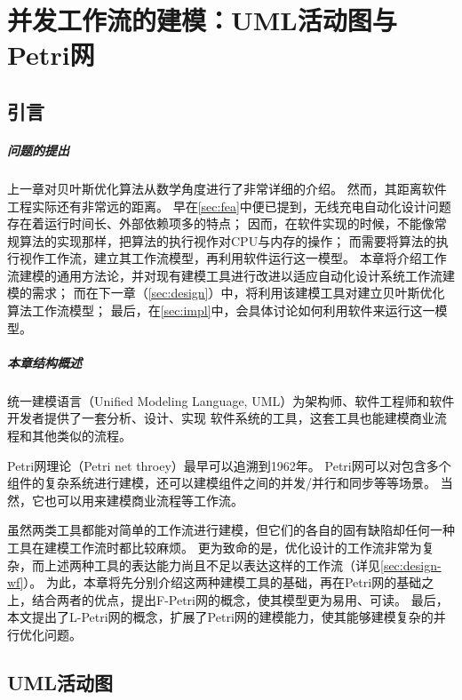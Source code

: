 \documentclass[index]{subfiles}
\begin{document}
\chapter{并发工作流的建模：UML活动图与Petri网}\label{sec:petri}
\section{引言}\label{sec:petri-intro}
\paragraph{问题的提出}
上一章对贝叶斯优化算法从数学角度进行了非常详细的介绍。
然而，其距离软件工程实际还有非常远的距离。
早在\cref{sec:fea}中便已提到，无线充电自动化设计问题存在着运行时间长、外部依赖项多的特点；
因而，在软件实现的时候，不能像常规算法的实现那样，把算法的执行视作对CPU与内存的操作；
而需要将算法的执行视作工作流，建立其工作流模型，再利用软件运行这一模型。
本章将介绍工作流建模的通用方法论，并对现有建模工具进行改进以适应自动化设计系统工作流建模的需求；
而在下一章（\cref{sec:design}）中，将利用该建模工具对建立贝叶斯优化算法工作流模型；
最后，在\cref{sec:impl}中，会具体讨论如何利用软件来运行这一模型。

\paragraph{本章结构概述}
统一建模语言（Unified Modeling Language, UML）为架构师、软件工程师和软件开发者提供了一套分析、设计、实现
软件系统的工具，这套工具也能建模商业流程和其他类似的流程\cite{omg}。

Petri网理论（Petri net throey）最早可以追溯到1962年\cite{petri1962}。
Petri网可以对包含多个组件的复杂系统进行建模，还可以建模组件之间的并发/并行和同步等等场景\cite{peterson1981}。
当然，它也可以用来建模商业流程等工作流\cite{ellis1993}。

虽然两类工具都能对简单的工作流进行建模，但它们的各自的固有缺陷却任何一种工具在建模工作流时都比较麻烦。
更为致命的是，优化设计的工作流非常为复杂，而上述两种工具的表达能力尚且不足以表达这样的工作流（详见\cref{sec:design-wf}）。
为此，本章将先分别介绍这两种建模工具的基础，再在Petri网的基础之上，结合两者的优点，提出F-Petri网的概念，使其模型更为易用、可读。
最后，本文提出了L-Petri网的概念，扩展了Petri网的建模能力，使其能够建模复杂的并行优化问题。

\section{UML活动图}
\end{document}
